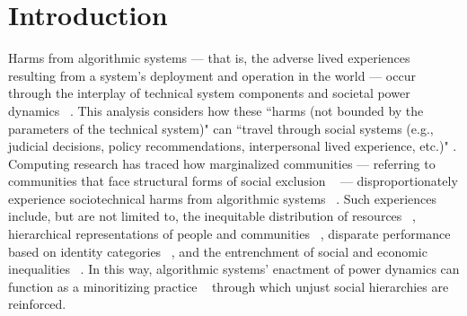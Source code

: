 \section{Introduction}
\label{introduction}
Harms from algorithmic systems — that is, the adverse lived experiences resulting from a system’s deployment and operation in the world — occur through the interplay of technical system components and societal power dynamics ~\cite{Green_Viljoen_2020}. This analysis considers how these ``harms (not bounded by the parameters of the technical system)" can ``travel through social systems (e.g., judicial decisions, policy recommendations, interpersonal lived experience, etc.)" \cite[n.p.]{DataSociety2022}. Computing research has traced how marginalized communities — referring to communities that face structural forms of social exclusion ~\cite{Liang_Munson_Kientz_2021} — disproportionately experience sociotechnical harms from algorithmic systems ~\cite{Friedman_Nissenbaum_1996, Graham_2005}. Such experiences include, but are not limited to, the inequitable distribution of resources ~\cite{Crawford_2017}, hierarchical representations of people and communities ~\cite{Noble_2018, Yee_Tantipongpipat_Mishra_2021}, disparate performance based on identity categories ~\cite{BarocasSelbst_2016, mengesha2021don}, and the entrenchment of social and economic inequalities  ~\cite{Benjamin_2019, Eubanks_2018}. In this way, algorithmic systems’ enactment of power dynamics \cite{Orlikowski_2000, henne2021} can function as a minoritizing practice ~\cite{Crooks_Currie_2021} through which unjust social hierarchies are reinforced. 

